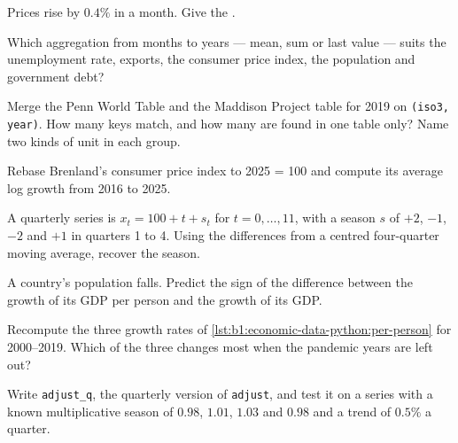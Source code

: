 \begin{exercise}[$\star$]\label{exo:b1:economic-data-python:annualise}
Prices rise by $0.4\%$ in a month. Give the .
\end{exercise}

\begin{exercise}[$\star$]\label{exo:b1:economic-data-python:aggregate}
Which aggregation from months to years --- mean, sum or last value --- suits
the unemployment rate, exports, the consumer price index, the population
and government debt?
\end{exercise}

\begin{exercise}[$\star\star$]\label{exo:b1:economic-data-python:maddison}
Merge the Penn World Table and the Maddison Project table for 2019 on
\texttt{(iso3, year)}. How many keys match, and how many are found in one
table only? Name two kinds of unit in each group.
\end{exercise}

\begin{exercise}[$\star\star$]\label{exo:b1:economic-data-python:rebase}
Rebase Brenland's consumer price index to 2025 = 100 and compute its average
log growth from 2016 to 2025.
\end{exercise}

\begin{exercise}[$\star\star$]\label{exo:b1:economic-data-python:toy}
A quarterly series is $x_t = 100 + t + s_t$ for $t = 0, \dots, 11$, with a season $s$ of
$+2$, $-1$, $-2$ and $+1$ in quarters 1 to 4. Using the differences from a centred
four-quarter moving average, recover the season.
\end{exercise}

\begin{exercise}[$\star\star$]\label{exo:b1:economic-data-python:falling}
A country's population falls. Predict the sign of the difference between
the growth of its GDP per person and the growth of its GDP.
\end{exercise}

\begin{exercise}[$\star\star$]\label{exo:b1:economic-data-python:hook}
Recompute the three growth rates of \cref{lst:b1:economic-data-python:per-person} for
2000--2019. Which of the three changes most when the pandemic years are
left out?
\end{exercise}

\begin{exercise}[$\star\star\star$]\label{exo:b1:economic-data-python:quarterly}
Write \texttt{adjust\_q}, the quarterly version of \texttt{adjust}, and test it on a
series with a known multiplicative season of $0.98$, $1.01$, $1.03$ and $0.98$ and a
trend of $0.5\%$ a quarter.
\end{exercise}


